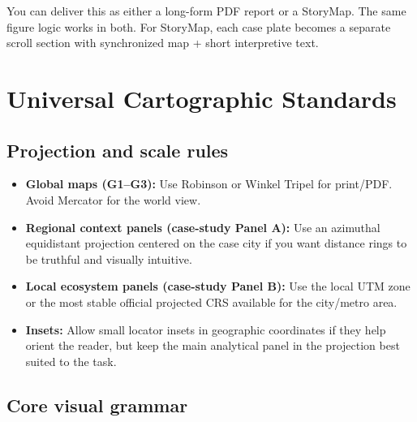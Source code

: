 \documentclass[11pt]{article}
\begin{document}
\noindent You can deliver this as either a long-form PDF report or a StoryMap. The same figure logic works in both. For StoryMap, each case plate becomes a separate scroll section with synchronized map + short interpretive text.

\section{Universal Cartographic Standards}

\subsection{Projection and scale rules}
\begin{itemize}[leftmargin=1.4em,itemsep=0.25em]
    \item \textbf{Global maps (G1--G3):} Use Robinson or Winkel Tripel for print/PDF. Avoid Mercator for the world view.
    \item \textbf{Regional context panels (case-study Panel A):} Use an azimuthal equidistant projection centered on the case city if you want distance rings to be truthful and visually intuitive.
    \item \textbf{Local ecosystem panels (case-study Panel B):} Use the local UTM zone or the most stable official projected CRS available for the city/metro area.
    \item \textbf{Insets:} Allow small locator insets in geographic coordinates if they help orient the reader, but keep the main analytical panel in the projection best suited to the task.
\end{itemize}

\subsection{Core visual grammar}
\end{document}
